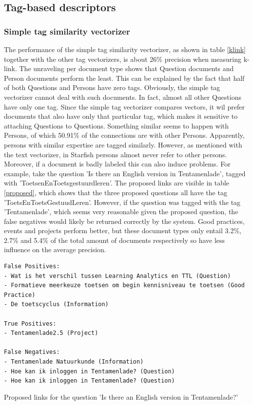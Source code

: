 \subsection{Tag-based descriptors}

\subsubsection{Simple tag similarity vectorizer}
The performance of the simple tag similarity vectorizer, as shown in table \ref{klink} together with the other tag vectorizers, is about 26\% precision when measuring k-link. The unraveling per document type shows that Question documents and Person documents perform the least. This can be explained by the fact that half of both Questions and Persons have zero tags. Obviously, the simple tag vectorizer cannot deal with such documents. In fact, almost all other Questions have only one tag. Since the simple tag vectorizer compares vectors, it wil prefer documents that also have only that particular tag, which makes it sensitive to attaching Questions to Questions. Something similar seems to happen with Persons, of which 50.91\% of the connections are with other Persons. Apparently, persons with similar expertise are tagged similarly. However, as mentioned with the text vectorizer, in Starfish persons almost never refer to other persons. Moreover, if a document is badly labeled this can also induce problems. For example, take the question 'Is there an English version in Tentamenlade', tagged with 'ToetsenEnToetsgestuurdleren'. The proposed links are visible in table \ref{proposed}, which shows that  the three proposed questions all have the tag 'ToetsEnToetsGestuudLeren'. However, if the question was tagged with the tag 'Tentamenlade', which seems very reasonable given the proposed question, the false negatives would likely be returned correctly by the system. Good practices, events and projects perform better, but these document types only entail 3.2\%, 2.7\% and 5.4\% of the total amount of documents respectively so have less influence on the average precision.

\begin{table}
\begin{lstlisting}
False Positives:
- Wat is het verschil tussen Learning Analytics en TTL (Question)
- Formatieve meerkeuze toetsen om begin kennisniveau te toetsen (Good Practice)
- De toetscyclus (Information)

True Positives:
- Tentamenlade2.5 (Project)

False Negatives:
- Tentamenlade Natuurkunde (Information)
- Hoe kan ik inloggen in Tentamenlade? (Question)
- Hoe kan ik inloggen in Tentamenlade? (Question)
\end{lstlisting}
\caption{Proposed links for the question 'Is there an English version in Tentamenlade?'}
\label{proposed}
\end{table}

